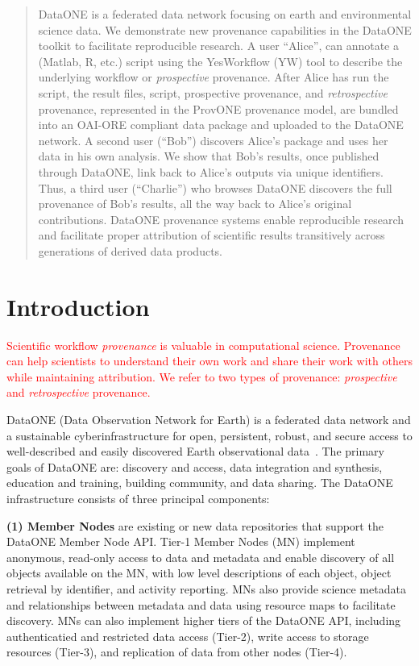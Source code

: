 \documentclass[a4paper]{llncs}
\newcommand{\mypara}[1]{\vspace{4pt}\noindent\textbf{#1}}
\begin{document}
\begin{abstract}
  DataONE is a federated data network focusing on earth and environmental science data.  We demonstrate new provenance capabilities in the DataONE toolkit to facilitate reproducible research. A user ``Alice'', can annotate a (Matlab, R, etc.) script using the YesWorkflow (YW) tool to describe the underlying workflow or \emph{prospective} provenance. After Alice has run the script, the result files, script, prospective provenance, and \emph{retrospective} provenance, represented in the ProvONE provenance model, are bundled into an OAI-ORE compliant data package and uploaded to the DataONE network. A second user (``Bob'') discovers Alice's package and uses her data in his own analysis. We show that Bob's results, once published through DataONE, link back to Alice's outputs via unique identifiers. Thus, a third user (``Charlie'') who browses DataONE discovers the full provenance of Bob's results, all the way back to Alice's original contributions.  DataONE provenance systems enable reproducible research and facilitate proper attribution of scientific results transitively across generations of derived data products.  \end{abstract}




\section{Introduction}

\textcolor{red}{Scientific workflow \emph{provenance} is valuable in computational science. Provenance can help scientists to understand their own work and share their work with others while maintaining attribution. We refer to two types of provenance: \emph{prospective} and \emph{retrospective} provenance. }

DataONE (Data Observation Network for Earth) is a federated data network and a sustainable cyberinfrastructure for open, persistent, robust, and secure access to well-described and easily discovered Earth observational data~\cite{dataone}. The primary goals of DataONE are: discovery and access, data integration and synthesis, education and training, building community, and data sharing. The DataONE infrastructure consists of three principal components:


\mypara{(1) Member Nodes} are existing or new data repositories that support the DataONE Member Node API.  Tier-1 Member Nodes (MN) implement anonymous, read-only access to data and metadata and enable discovery of all objects available on the MN, with low level descriptions of each object, object retrieval by identifier, and activity reporting. MNs also provide science metadata and relationships between metadata and data using resource maps \cite{oaiore} to facilitate discovery.  MNs can also implement higher tiers of the DataONE API, including authenticatied and restricted data access (Tier-2), write access to storage resources (Tier-3), and replication of data from other nodes (Tier-4).
\end{document}
